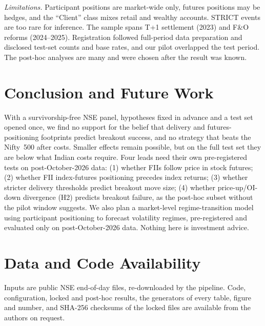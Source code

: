 \documentclass[conference]{IEEEtran}
\begin{document}
\emph{Limitations.} Participant positions are market-wide only, futures positions may be hedges, and the
``Client'' class mixes retail and wealthy accounts. STRICT events are too rare for inference. The sample spans
T+1 settlement (2023) and F\&O reforms (2024--2025). Registration followed full-period data preparation and
disclosed test-set counts and base rates, and our pilot overlapped the test period. The post-hoc analyses are
many and were chosen after the result was known.

\section{Conclusion and Future Work}
With a survivorship-free NSE panel, hypotheses fixed in advance and a test set opened once, we find no support
for the belief that delivery and futures-positioning footprints predict breakout success, and no strategy that
beats the Nifty~500 after costs. Smaller effects remain possible, but on the full test set they are below what
Indian costs require. Four leads need their own pre-registered tests on post-October-2026 data: (1) whether
FIIs follow price in stock futures; (2) whether FII index-futures positioning precedes index returns; (3)
whether stricter delivery thresholds predict breakout move size; (4) whether price-up/OI-down divergence (H2)
predicts breakout failure, as the post-hoc subset without the pilot window suggests. We also plan a
market-level regime-transition model using participant positioning to forecast volatility regimes,
pre-registered and evaluated only on post-October-2026 data. Nothing here is investment advice.

\section*{Data and Code Availability}
Inputs are public NSE end-of-day files, re-downloaded by the pipeline. Code, configuration, locked and
post-hoc results, the generators of every table, figure and number, and SHA-256 checksums of the locked files
are available from the authors on request.
\end{document}
